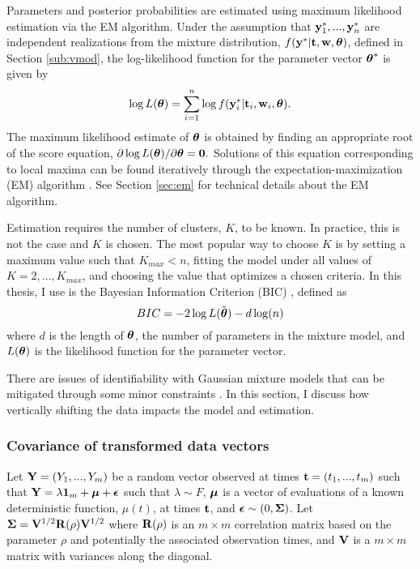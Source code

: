 Parameters and posterior probabilities are estimated using maximum likelihood estimation via the EM algorithm. Under the assumption that $\mathbf y^{*}_{1},...,\mathbf y^{*}_{n}$ are independent realizations from the mixture distribution, $f(\mathbf y^{*} | \mathbf t, \mathbf w, \boldsymbol\theta)$, defined in Section \ref{sub:vmod}, the log-likelihood function for the parameter vector $\boldsymbol \theta^{*}$ is given by
$$\log L(\boldsymbol\theta)=\sum^{n}_{i=1}\log f(\mathbf y^{*}_{i}|\mathbf t_{i},\mathbf w_{i},\boldsymbol \theta).$$
The maximum likelihood estimate of $\boldsymbol\theta$ is obtained by finding an appropriate root of the score equation, $\partial \log L(\boldsymbol\theta)/\partial \boldsymbol\theta=\mathbf 0.$ Solutions of this equation corresponding to local maxima can be found iteratively through the expectation-maximization (EM) algorithm \cite{dempster1977}. See Section \ref{sec:em} for technical details about the EM algorithm.

Estimation requires the number of clusters, $K$, to be known. In practice, this is not the case and $K$ is chosen. The most popular way to choose $K$ is by setting a maximum value such that $K_{max}<n$, fitting the model under all values of $K=2,...,K_{max}$, and choosing the value that optimizes a chosen criteria. In this thesis, I use is the Bayesian Information Criterion (BIC) \cite{schwarz1978}, defined as
$$BIC = -2\log L(\hat{\boldsymbol\theta})- d\log(n)$$
where $d$ is the length of $\boldsymbol\theta$, the number of parameters in the mixture model, and $L(\boldsymbol\theta)$ is the likelihood function for the parameter vector.

There are issues of identifiability with Gaussian mixture models that can be mitigated through some minor constraints \cite{mclachlan2000}. In this section, I discuss how vertically shifting the data impacts the model and estimation.

\subsubsection{Covariance of transformed data vectors}
Let $\mathbf Y=(Y_{1},...,Y_{m})$ be a random vector observed at times $\mathbf t=(t_{1},...,t_{m})$ such that
$\mathbf Y = \lambda\mathbf 1_{m} + \boldsymbol\mu + \boldsymbol\epsilon$
such that $\lambda\sim F$, $\boldsymbol\mu$ is a vector of evaluations of a known deterministic function, $\mu(t)$, at times $\mathbf t$, and $\boldsymbol\epsilon\sim(0,\boldsymbol\Sigma)$. Let $\mathbf\Sigma =\mathbf V^{1/2}\mathbf R(\rho)\mathbf V^{1/2}$ where $\mathbf R(\rho)$ is an $m\times m$ correlation matrix based on the parameter $\rho$ and potentially the associated observation times, and $\mathbf V$ is a $m\times m$ matrix with variances along the diagonal. 

